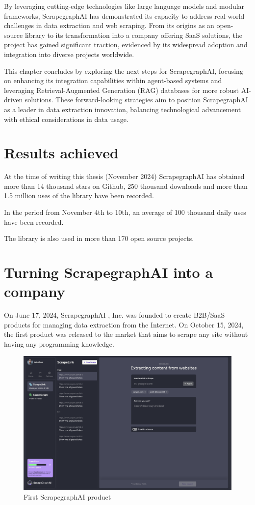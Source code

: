 By leveraging cutting-edge technologies like large language models and modular frameworks, ScrapegraphAI has demonstrated its capacity to address real-world challenges in data extraction and web scraping. From its origins as an open-source library to its transformation into a company offering SaaS solutions, the project has gained significant traction, evidenced by its widespread adoption and integration into diverse projects worldwide.

This chapter concludes by exploring the next steps for ScrapegraphAI, focusing on enhancing its integration capabilities within agent-based systems and leveraging Retrieval-Augmented Generation (RAG) databases for more robust AI-driven solutions. These forward-looking strategies aim to position ScrapegraphAI as a leader in data extraction innovation, balancing technological advancement with ethical considerations in data usage.
\section{Results achieved}
At the time of writing this thesis (November 2024) ScrapegraphAI  has obtained more than 14 thousand stars on Github, 250 thousand downloads and more than 1.5 million uses of the library have been recorded. 

In the period from November 4th to 10th, an average of 100 thousand daily uses have been recorded.

The library is also used in more than 170 open source projects.
\section{Turning ScrapegraphAI  into a company}
On June 17, 2024, ScrapegraphAI , Inc. was founded to create B2B/SaaS products for managing data extraction from the Internet.
On October 15, 2024, the first product was released to the market that aims to scrape any site without having any programming knowledge.

\begin{figure}[H]
    \centering
    \includegraphics[width=1\linewidth]{Assets/webapp.png}
    \caption{First ScrapegraphAI  product}
    \label{fig:enter-label}
\end{figure}

